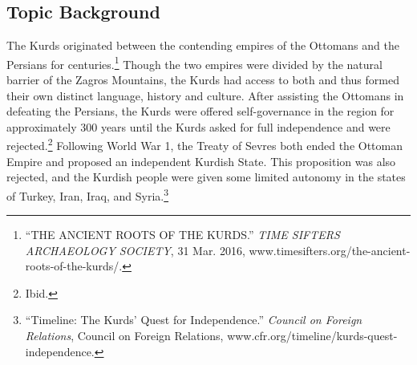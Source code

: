 \documentclass[10pt, letterpaper]{article}
\begin{document}
\subsection{Topic Background}

The Kurds originated between the contending empires of the Ottomans and
the Persians for centuries.\footnote{``THE ANCIENT ROOTS OF THE KURDS.''
  \emph{TIME SIFTERS ARCHAEOLOGY SOCIETY}, 31 Mar. 2016,
  www.timesifters.org/the-ancient-roots-of-the-kurds/.} Though the two
empires were divided by the natural barrier of the Zagros Mountains, the
Kurds had access to both and thus formed their own distinct language,
history and culture. After assisting the Ottomans in defeating the
Persians, the Kurds were offered self-governance in the region for
approximately 300 years until the Kurds asked for full independence and
were rejected.\footnote{Ibid.} Following World War 1, the Treaty of
Sevres both ended the Ottoman Empire and proposed an independent Kurdish
State. This proposition was also rejected, and the Kurdish people were
given some limited autonomy in the states of Turkey, Iran, Iraq, and
Syria.\footnote{``Timeline: The Kurds' Quest for Independence.''
  \emph{Council on Foreign Relations}, Council on Foreign Relations,
  www.cfr.org/timeline/kurds-quest-independence.} \\
\end{document}
